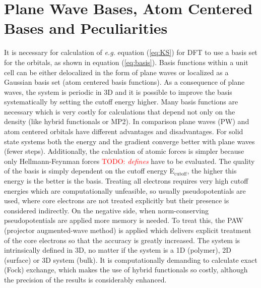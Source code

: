 \documentclass[11pt,DIV=13,BCOR=5mm,a4paper,headinclude]{scrbook}
\newcommand\todo[1]{\textcolor{red}{TODO: \textit{{#1}}}}
\begin{document}
\section{Plane Wave Bases, Atom Centered Bases and Peculiarities}
It is necessary for calculation of \textit{e.g.} equation (\ref{eq:KS}) for DFT to use a basis set for the orbitals, as shown in equation (\ref{eq:basis}).
Basis functions within a unit cell can be either delocalized in the form of plane waves or localized as a Gaussian basis set (atom centered basis functions).
As a consequence of plane waves, the system is periodic in 3D and it is possible to improve the basis systematically by setting the cutoff energy higher.
Many basis functions are necessary which is very costly for calculations that depend not only on the density (like hybrid functionals or MP2).
In comparison plane waves (PW) and atom centered orbitals have different advantages and disadvantages\cite{Tosoni2007}.
For solid state systems both the energy and the gradient converge better with plane waves (fewer steps).
Additionally, the calculation of atomic forces is simpler because only Hellmann-Feynman forces \todo{defines} have to be evaluated.
The quality of the basis is simply dependent on the cutoff energy E$_\textrm{cutoff}$, the higher this energy is the better is the basis.
Treating all electrons requires very high cutoff energies  which are computationally unfeasible, so usually pseudopotentials are used, where core electrons are not treated explicitly but their presence is considered indirectly.
On the negative side, when norm-conserving pseudopotentials are applied more memory is needed.
To treat this, the PAW (projector augmented-wave method)\cite{paw1,Kresse1999} is applied which delivers explicit treatment of the core electrons so that the accuracy is greatly increased.
The system is intrinsically defined in 3D, no matter if the system is a 1D (polymer), 2D (surface) or 3D system (bulk).
It is computationally demanding to calculate exact (Fock) exchange, which makes the use of hybrid functionals so costly, although the precision of the results is considerably enhanced.
\\
\end{document}
